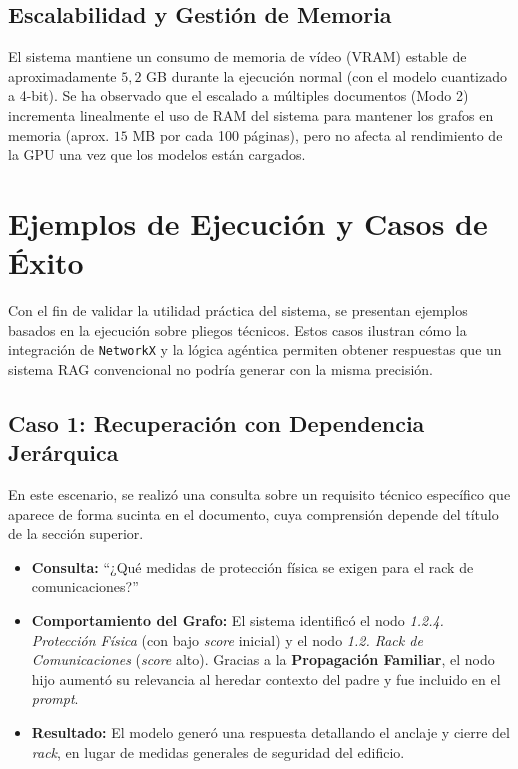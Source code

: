 \subsection{Escalabilidad y Gestión de Memoria}
El sistema mantiene un consumo de memoria de vídeo (VRAM) estable de aproximadamente $5,2$ GB durante la ejecución normal (con el modelo cuantizado a 4-bit). Se ha observado que el escalado a múltiples documentos (Modo 2) incrementa linealmente el uso de RAM del sistema para mantener los grafos en memoria (aprox. $15$ MB por cada 100 páginas), pero no afecta al rendimiento de la GPU una vez que los modelos están cargados.

\section{Ejemplos de Ejecución y Casos de Éxito}

Con el fin de validar la utilidad práctica del sistema, se presentan ejemplos basados en la ejecución sobre pliegos técnicos. Estos casos ilustran cómo la integración de \texttt{NetworkX} y la lógica agéntica permiten obtener respuestas que un sistema RAG convencional no podría generar con la misma precisión.

\subsection{Caso 1: Recuperación con Dependencia Jerárquica}
En este escenario, se realizó una consulta sobre un requisito técnico específico que aparece de forma sucinta en el documento, cuya comprensión depende del título de la sección superior.

\begin{itemize}
    \item \textbf{Consulta:} ``¿Qué medidas de protección física se exigen para el rack de comunicaciones?''
    \item \textbf{Comportamiento del Grafo:} El sistema identificó el nodo \textit{1.2.4. Protección Física} (con bajo \textit{score} inicial) y el nodo \textit{1.2. Rack de Comunicaciones} (\textit{score} alto). Gracias a la \textbf{Propagación Familiar}, el nodo hijo aumentó su relevancia al heredar contexto del padre y fue incluido en el \textit{prompt}.
    \item \textbf{Resultado:} El modelo generó una respuesta detallando el anclaje y cierre del \textit{rack}, en lugar de medidas generales de seguridad del edificio.
\end{itemize}

